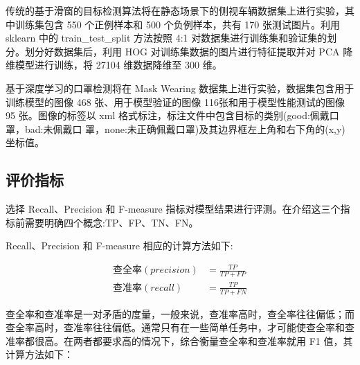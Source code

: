 传统的基于滑窗的目标检测算法将在静态场景下的侧视车辆数据集上进行实验，其中训练集包含 550 个正例样本和 500 个负例样本，共有 170 张测试图片。利用 sklearn 中的 train\_test\_split 方法按照 4:1 对数据集进行训练集和验证集的划分。划分好数据集后，利用 HOG 对训练集数据的图片进行特征提取并对 PCA 降维模型进行训练，将 27104 维数据降维至 300 维。

基于深度学习的口罩检测将在 Mask Wearing 数据集上进行实验，数据集包含用于训练模型的图像 468 张、用于模型验证的图像 116张和用于模型性能测试的图像 95 张。图像的标签以 xml 格式标注，标注文件中包含目标的类别(good:佩戴口罩，bad:未佩戴口 罩，none:未正确佩戴口罩)及其边界框左上角和右下角的(x,y)坐标值。

\subsection{评价指标}

选择 Recall、Precision 和 F-measure 指标对模型结果进行评测。在介绍这三个指标前需要明确四个概念:TP、FP、TN、FN。


\begin{table}[htbp]
  \centering
  \caption{分类结果混淆矩阵}
\end{table}%


Recall、Precision 和 F-measure 相应的计算方法如下: 

\begin{equation}
\begin{aligned}
	查全率(precision) &= \frac{TP}{TP+FP}\\
	查准率(recall) &= \frac{TP}{TP+FN}
\end{aligned}
\end{equation}

查全率和查准率是一对矛盾的度量，一般来说，查准率高时，查全率往往偏低；而查全率高时，查准率往往偏低。通常只有在一些简单任务中，才可能使查全率和查准率都很高。在两者都要求高的情况下，综合衡量查全率和查准率就用 F1 值，其计算方法如下：


